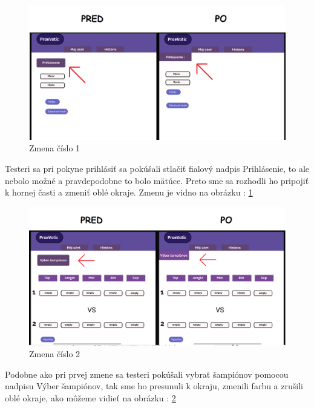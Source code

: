 \begin{figure}[h!]
	
	\includegraphics[width=.9\textwidth]{figures/predtym}
	
	\centering
	
	\caption{ Zmena číslo 1\label{predtym}}

	
	
\end{figure}


Testeri sa pri pokyne prihlásiť sa pokúšali stlačiť fialový nadpis Prihlásenie, to ale nebolo možné a pravdepodobne to bolo mätúce. Preto sme sa rozhodli ho pripojiť k hornej časti a zmeniť oblé okraje. Zmenu je vidno na obrázku : \ref{predtym}


\begin{figure}[h!]
	
	\includegraphics[width=.9\textwidth]{figures/2}
	
	\centering
	
	\caption{Zmena číslo 2\label{2}}
	
\end{figure}

	Podobne ako pri prvej zmene sa testeri pokúšali vybrať šampiónov pomocou nadpisu Výber šampiónov, tak sme ho presunuli k okraju, zmenili farbu a zrušili oblé okraje, ako môžeme vidieť na obrázku : \ref{2} 

